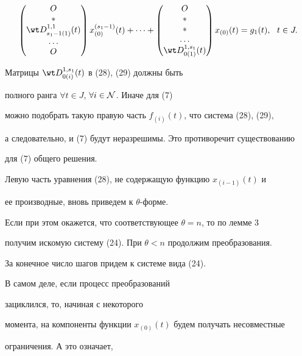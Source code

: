 \begin{pf}
\begin{gather}
\begin{pmatrix}
O \\ \ast \\ \wt D_{s_1-1(1)}^{1,1}(t) \\ \dotsc \\ O 


\end{pmatrix} x_{(0)}^{(s_1-1)}(t) + \dotsb+


\begin{pmatrix}


O \\ \ast \\ \ast \\ \dotsc \\ \wt D_{0(1)}^{1,s_1}(t) 


\end{pmatrix} x_{(0)}(t) =g_1(t), \ \ t \in J.


\end{gather}





Матрицы $\wt D_{0(i)}^{1,s_1}(t) $ в (28), (29) должны быть


полного ранга $\forall t \in J$, \; $\forall i \in \cal N $. Иначе для (7)


можно подобрать такую правую часть $f_{(i)}(t)$, что система (28), (29),


а следовательно, и (7) будут неразрешимы. Это противоречит существованию


для (7) общего решения.





Левую часть уравнения (28), не содержащую функцию $x_{(i-1)}(t)$ и 


ее производные, вновь приведем к $\theta$-форме. 


Если при этом окажется, что соответствующее $\theta=n$, то по лемме 3


получим искомую систему (24). При $\theta <n$ продолжим преобразования.


За конечное число шагов придем к системе вида (24).





В самом деле, если процесс преобразований 


зациклился, то, начиная с некоторого


момента, на компоненты функции $x_{(0)}(t)$ будем получать несовместные


ограничения. А это означает, 



\end{pf}

